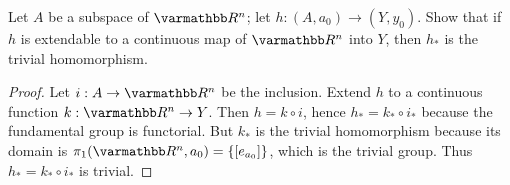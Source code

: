 \documentclass[10pt,oneside,openany]{memoir}
\begin{document}
\begin{exercise}[manual-num={5}]
    Let $A$ be a subspace of $\bfR^n$; let $h:(A,a_0) \rightarrow (Y,y_0)$. Show that if $h$ is extendable to a continuous map of $\bfR^n$ into $Y$, then $h_\ast$ is the trivial homomorphism.
\end{exercise}
    \begin{proof}
        Let $i:A \rightarrow \bfR^n$ be the inclusion. Extend $h$ to a continuous function $k:\bfR^n \rightarrow Y$. Then $h = k \circ i$, hence $h_\ast = k_\ast \circ i_\ast$ because the fundamental group is functorial. But $k_\ast$ is the trivial homomorphism because its domain is $\pi_1(\bfR^n,a_0) = \{[e_{a_0}]\}$, which is the trivial group. Thus $h_\ast = k_\ast \circ i_\ast$ is trivial.
    \end{proof}

\end{document}
